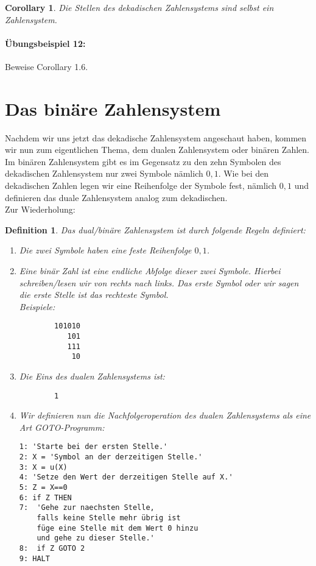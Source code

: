 \documentclass[11pt,a4paper,leqno]{report}
\newtheorem{definition}[theorem]{Definition}
\newtheorem{corollary}[theorem]{Corollary}
\numberwithin{equation}{chapter}
\begin{document}
\begin{corollary}
	Die Stellen des dekadischen Zahlensystems sind selbst ein Zahlensystem.
\end{corollary}
\paragraph{Übungsbeispiel 12:} Beweise Corollary 1.6.
\section{Das binäre Zahlensystem}
Nachdem wir uns jetzt das dekadische Zahlensystem angeschaut haben, kommen wir nun zum eigentlichen Thema, dem dualen Zahlensystem oder binären Zahlen. Im binären Zahlensystem gibt es im Gegensatz zu den zehn Symbolen des dekadischen Zahlensystem nur zwei Symbole nämlich ${0, 1}$. Wie bei den dekadischen Zahlen legen wir eine Reihenfolge der Symbole fest, nämlich $0, 1$ und definieren das duale Zahlensystem analog zum dekadischen.\\
Zur Wiederholung: 
\begin{definition}
	Das dual/binäre Zahlensystem ist durch folgende Regeln definiert:
	\begin{enumerate}
		\item Die zwei Symbole haben eine feste Reihenfolge $0, 1$.
		\item Eine binär Zahl ist eine endliche Abfolge dieser zwei Symbole. Hierbei schreiben/lesen wir von rechts nach links. Das erste Symbol oder wir sagen die erste Stelle ist das rechteste Symbol. \\Beispiele:
		\begin{lstlisting}
		101010
		   101
		   111
		    10
		\end{lstlisting}
		\item Die Eins des dualen Zahlensystems ist:
		\begin{lstlisting}
		1
		\end{lstlisting}
		\item Wir definieren nun die Nachfolgeroperation des dualen Zahlensystems als eine Art GOTO-Programm:
		\begin{lstlisting}
1: 'Starte bei der ersten Stelle.'
2: X = 'Symbol an der derzeitigen Stelle.'
3: X = u(X)
4: 'Setze den Wert der derzeitigen Stelle auf X.'
5: Z = X==0
6: if Z THEN
7: 	'Gehe zur naechsten Stelle, 
	falls keine Stelle mehr übrig ist 
	füge eine Stelle mit dem Wert 0 hinzu
	und gehe zu dieser Stelle.'
8:	if Z GOTO 2
9: HALT
		\end{lstlisting}
	\end{enumerate}
\end{definition}
\end{document}
